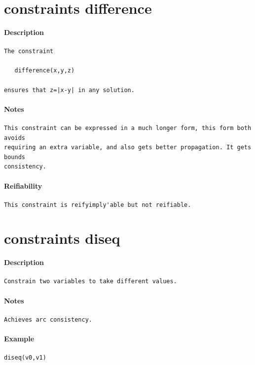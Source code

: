 \documentclass[oneside]{book}
\begin{document}
\section{constraints difference}
\paragraph{Description}
{\footnotesize
\begin{verbatim}
The constraint

   difference(x,y,z)

ensures that z=|x-y| in any solution.
\end{verbatim}
}
\paragraph{Notes}
{\footnotesize
\begin{verbatim}
This constraint can be expressed in a much longer form, this form both avoids
requiring an extra variable, and also gets better propagation. It gets bounds
consistency.
\end{verbatim}
}
\paragraph{Reifiability}
{\footnotesize
\begin{verbatim}
This constraint is reifyimply'able but not reifiable.
\end{verbatim}
}
\section{constraints diseq}
\paragraph{Description}
{\footnotesize
\begin{verbatim}
Constrain two variables to take different values.
\end{verbatim}
}
\paragraph{Notes}
{\footnotesize
\begin{verbatim}
Achieves arc consistency.
\end{verbatim}
}
\paragraph{Example}
{\footnotesize
\begin{verbatim}
diseq(v0,v1)
\end{verbatim}
}
\end{document}

